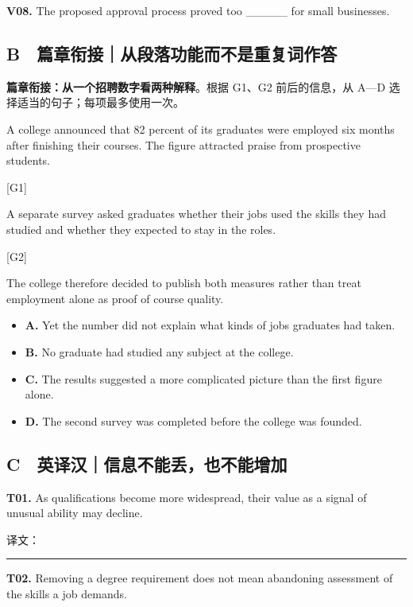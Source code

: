 \documentclass[
  11pt,
]{ctexart}
\begin{document}
\textbf{V08.} The proposed approval process proved too \_\_\_\_\_ for
small businesses.

\subsection{B　篇章衔接｜从段落功能而不是重复词作答}\label{b-ux7bc7ux7ae0ux8854ux63a5ux4eceux6bb5ux843dux529fux80fdux800cux4e0dux662fux91cdux590dux8bcdux4f5cux7b54}

\textbf{篇章衔接：从一个招聘数字看两种解释}。根据 G1、G2 前后的信息，从
A---D 选择适当的句子；每项最多使用一次。

A college announced that 82 percent of its graduates were employed six
months after finishing their courses. The figure attracted praise from
prospective students.

{[}G1{]}

A separate survey asked graduates whether their jobs used the skills
they had studied and whether they expected to stay in the roles.

{[}G2{]}

The college therefore decided to publish both measures rather than treat
employment alone as proof of course quality.

\begin{itemize}
\item
  \textbf{A.} Yet the number did not explain what kinds of jobs
  graduates had taken.
\item
  \textbf{B.} No graduate had studied any subject at the college.
\item
  \textbf{C.} The results suggested a more complicated picture than the
  first figure alone.
\item
  \textbf{D.} The second survey was completed before the college was
  founded.
\end{itemize}

\subsection{C　英译汉｜信息不能丢，也不能增加}\label{c-ux82f1ux8bd1ux6c49ux4fe1ux606fux4e0dux80fdux4e22ux4e5fux4e0dux80fdux589eux52a0}

\textbf{T01.} As qualifications become more widespread, their value as a
signal of unusual ability may decline.

译文：

\rule{0.8\linewidth}{0.35pt}

\textbf{T02.} Removing a degree requirement does not mean abandoning
assessment of the skills a job demands.
\end{document}

